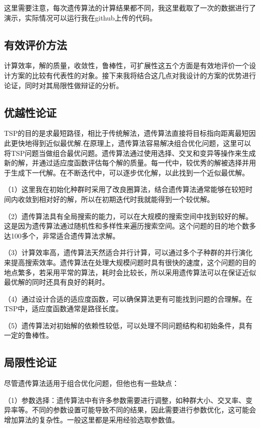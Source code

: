\documentclass{cjc}
\begin{document}
这里需要注意，每次遗传算法的计算结果都不同，我这里截取了一次的数据进行了演示，实际情况可以运行我在github上传的代码。

\subsection{有效评价方法}
计算效率，解的质量，收敛性，鲁棒性，可扩展性这五个方面是有效地评价一个设计方案的比较有代表性的对象。接下来我将结合这几点对我设计的方案的优势进行论证，同时对其局限性做辩证的分析。

\subsection{优越性论证}
TSP的目的是求最短路径，相比于传统解法，遗传算法直接将目标指向距离最短因此更快地得到近似最优解.在原理上，遗传算法容易解决组合优化问题，这里可以将TSP问题当做组合最优问题。遗传算法通过使用选择、交叉和变异等操作来生成新的解，并通过适应度函数评估每个解的质量。每一代中，较优秀的解被选择并用于生成下一代解。在不断迭代中，可以逐步优化解，以此找到一个近似最优解。

（1）这里我在初始化种群时采用了改良圈算法，结合遗传算法通常能够在较短时间内收敛到相对好的解，所以在初期迭代时我就能得到一个较优解。

（2）遗传算法具有全局搜索的能力，可以在大规模的搜索空间中找到较好的解。这是因为遗传算法通过随机性和多样性来遍历搜索空间。这个问题的目的地个数多达100多个，非常适合遗传算法求解。

（3）计算效率高，遗传算法天然适合并行计算，可以通过多个子种群的并行演化来提高搜索效率。遗传算法在处理大规模问题时具有很快的速度，这个问题的目的地点繁多，若采用平常的算法，耗时会比较长，所以采用遗传算法可以在保证近似最优解的同时还具有良好的耗时。

（4）通过设计合适的适应度函数，可以确保算法更有可能找到问题的合理解。在TSP中，适应度函数通常是路径长度。

（5）遗传算法对初始解的依赖性较低，可以处理不同问题结构和初始条件，具有一定的鲁棒性。

\subsection{局限性论证}
尽管遗传算法适用于组合优化问题，但他也有一些缺点：

（1）参数选择：遗传算法中有许多参数需要进行调整，如种群大小、交叉率、变异率等。不同的参数设置可能导致不同的结果，因此需要进行参数优化，这可能会增加算法的复杂性。一般这里都是采用经验选取参数值。
\end{document}
